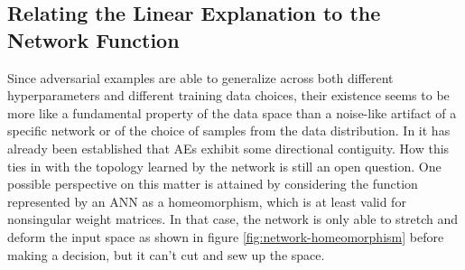 \documentclass[11pt, a4paper]{article}
\begin{document}
\subsection{Relating the Linear Explanation to the Network Function}
Since adversarial examples are able to generalize across both different hyperparameters and different training data choices, their existence seems to be more like a fundamental property of the data space than a noise-like artifact of a specific network or of the choice of samples from the data distribution. In \cite{explaining-and-harnessing-adversarial-examples} it has already been established that AEs exhibit some directional contiguity. How this ties in with the topology learned by the network is still an open question. One possible perspective on this matter is attained by considering the function represented by an ANN as a homeomorphism, which is at least valid for nonsingular weight matrices. In that case, the network is only able to stretch and deform the input space as shown in figure \ref{fig:network-homeomorphism} before making a decision, but it can't cut and sew up the space.
\end{document}
